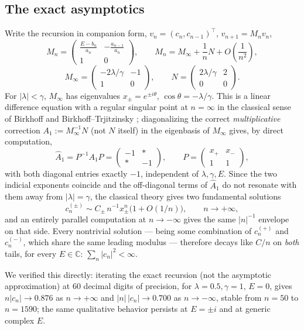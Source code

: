 \documentclass[11pt]{amsart}
\theoremstyle{remark}
\begin{document}
\subsection{The exact asymptotics}
Write the recursion in companion form, $v_n=(c_n,c_{n-1})^\top$, $v_{n+1}=M_nv_n$,
\[
M_n = \begin{pmatrix}\frac{E-b_n}{a_n} & -\frac{a_{n-1}}{a_n}\\ 1&0\end{pmatrix},\qquad M_n = M_\infty+\frac1nN+O\!\left(\frac1{n^2}\right),
\]
\[
M_\infty=\begin{pmatrix}-2\lambda/\gamma&-1\\1&0\end{pmatrix},\qquad N=\begin{pmatrix}2\lambda/\gamma&2\\0&0\end{pmatrix}.
\]
For $|\lambda|<\gamma$, $M_\infty$ has eigenvalues $x_\pm=e^{\pm i\theta}$, $\cos\theta=-\lambda/\gamma$. This is a linear difference equation with a regular singular point at $n=\infty$ in the classical sense of Birkhoff \cite{Birkhoff} and Birkhoff--Trjitzinsky \cite{BirkhoffTrjitzinsky}; diagonalizing the correct \emph{multiplicative} correction $A_1:=M_\infty^{-1}N$ (not $N$ itself) in the eigenbasis of $M_\infty$ gives, by direct computation,
\[
\hat A_1 = P^{-1}A_1P = \begin{pmatrix}-1&\ast\\ \ast&-1\end{pmatrix},\qquad P=\begin{pmatrix}x_+&x_-\\1&1\end{pmatrix},
\]
with both diagonal entries exactly $-1$, independent of $\lambda,\gamma,E$. Since the two indicial exponents coincide and the off-diagonal terms of $\hat A_1$ do not resonate with them away from $|\lambda|=\gamma$, the classical theory gives two fundamental solutions
\[
c_n^{(\pm)} \sim C_\pm\, n^{-1}x_\pm^n\bigl(1+O(1/n)\bigr),\qquad n\to+\infty,
\]
and an entirely parallel computation at $n\to-\infty$ gives the same $|n|^{-1}$ envelope on that side. Every nontrivial solution --- being some combination of $c_n^{(+)}$ and $c_n^{(-)}$, which share the same leading modulus --- therefore decays like $C/n$ on \emph{both} tails, for every $E\in\mathbb C$: $\sum_n|c_n|^2<\infty$.

We verified this directly: iterating the exact recursion (not the asymptotic approximation) at $60$ decimal digits of precision, for $\lambda=0.5,\gamma=1$, $E=0$, gives $n|c_n|\to0.876$ as $n\to+\infty$ and $|n|\,|c_n|\to0.700$ as $n\to-\infty$, stable from $n=50$ to $n=1590$; the same qualitative behavior persists at $E=\pm i$ and at generic complex $E$.
\end{document}
